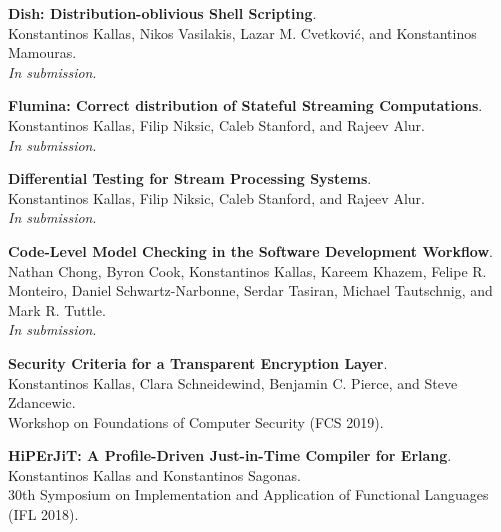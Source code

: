 \begin{minipage}{\textwidth}
\textbf{Dish: Distribution-oblivious Shell Scripting}. \\
Konstantinos Kallas, Nikos Vasilakis, Lazar M. Cvetković, and Konstantinos Mamouras. \\
\emph{In submission}.
\end{minipage}

\begin{minipage}{\textwidth}
\textbf{Flumina: Correct distribution of Stateful Streaming Computations}. \\
Konstantinos Kallas, Filip Niksic, Caleb Stanford, and Rajeev Alur. \\
\emph{In submission}.
\end{minipage}

\begin{minipage}{\textwidth}
\textbf{Differential Testing for Stream Processing Systems}. \\
Konstantinos Kallas, Filip Niksic, Caleb Stanford, and Rajeev Alur. \\
\emph{In submission}.
\end{minipage}

\begin{minipage}{\textwidth}
\textbf{Code-Level Model Checking in the Software Development Workflow}. \\
Nathan Chong, Byron Cook, Konstantinos Kallas, Kareem Khazem, Felipe R. Monteiro, Daniel Schwartz-Narbonne, Serdar Tasiran, Michael Tautschnig, and Mark R. Tuttle. \\
\emph{In submission}.
\end{minipage}

\begin{minipage}{\textwidth}
\textbf{Security Criteria for a Transparent Encryption Layer}. \\
Konstantinos Kallas, Clara Schneidewind, Benjamin C. Pierce, and Steve Zdancewic. \\
Workshop on Foundations of Computer Security (FCS 2019).
\end{minipage}

\begin{minipage}{\textwidth}
\textbf{HiPErJiT: A Profile-Driven Just-in-Time Compiler for Erlang}. \\
Konstantinos Kallas and Konstantinos Sagonas. \\
30th Symposium on Implementation and Application of Functional Languages (IFL 2018).
\end{minipage}


